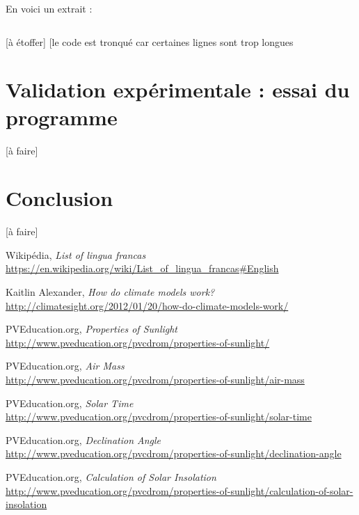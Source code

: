 \documentclass[12pt]{article}
\begin{document}
En voici un extrait :

\inputminted[linenos]{rust}{temperature.rs}

[à étoffer]
[le code est tronqué car certaines lignes sont trop longues

\clearpage
\section{Validation expérimentale : essai du programme}

[à faire]

\clearpage
\section{Conclusion}

[à faire]


\begin{thebibliography}{99}

	Wikipédia,
	\emph{List of lingua francas}\\
	\url{https://en.wikipedia.org/wiki/List_of_lingua_francas#English}

	Kaitlin Alexander,
	\emph{How do climate models work?}\\
	\url{http://climatesight.org/2012/01/20/how-do-climate-models-work/}

	PVEducation.org,
	\emph{Properties of Sunlight}\\
	\url{http://www.pveducation.org/pvcdrom/properties-of-sunlight/}

	PVEducation.org,
	\emph{Air Mass}\\
	\url{http://www.pveducation.org/pvcdrom/properties-of-sunlight/air-mass}

	PVEducation.org,
	\emph{Solar Time}\\
	\url{http://www.pveducation.org/pvcdrom/properties-of-sunlight/solar-time}

	PVEducation.org,
	\emph{Declination Angle}\\
	\url{http://www.pveducation.org/pvcdrom/properties-of-sunlight/declination-angle}

	PVEducation.org,
	\emph{Calculation of Solar Insolation}\\
	\url{http://www.pveducation.org/pvcdrom/properties-of-sunlight/calculation-of-solar-insolation}


\end{thebibliography}
\end{document}
